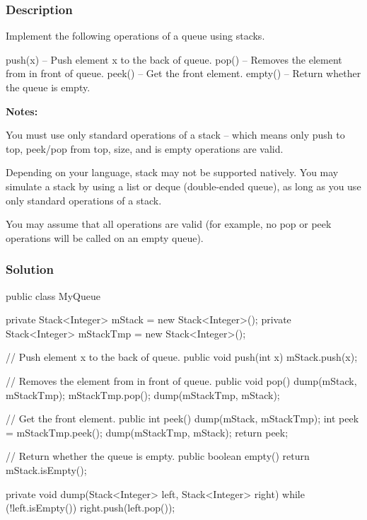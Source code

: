 \subsubsection{Description}
Implement the following operations of a queue using stacks.
\begin{Code}
push(x) -- Push element x to the back of queue.
pop() -- Removes the element from in front of queue.
peek() -- Get the front element.
empty() -- Return whether the queue is empty.
\end{Code}

\textbf{Notes:}

You must use only standard operations of a stack -- which means only push to top, peek/pop from top, size, and is empty operations are valid.

Depending on your language, stack may not be supported natively. You may simulate a stack by using a list or deque (double-ended queue), as long as you use only standard operations of a stack.

You may assume that all operations are valid (for example, no pop or peek operations will be called on an empty queue).

\subsubsection{Solution}

\begin{Code}
public class MyQueue {
    private Stack<Integer> mStack = new Stack<Integer>();
    private Stack<Integer> mStackTmp = new Stack<Integer>();

    // Push element x to the back of queue.
    public void push(int x) {
        mStack.push(x);
    }

    // Removes the element from in front of queue.
    public void pop() {
        dump(mStack, mStackTmp);
        mStackTmp.pop();
        dump(mStackTmp, mStack);
    }

    // Get the front element.
    public int peek() {
        dump(mStack, mStackTmp);
        int peek = mStackTmp.peek();
        dump(mStackTmp, mStack);
        return peek;
    }

    // Return whether the queue is empty.
    public boolean empty() {
        return mStack.isEmpty();
    }

    private void dump(Stack<Integer> left, Stack<Integer> right) {
        while (!left.isEmpty()) {
            right.push(left.pop());
        }
    }
}

\end{Code}

